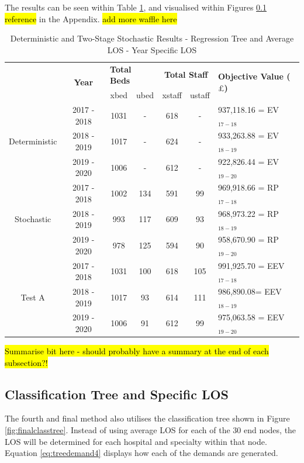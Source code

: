 \documentclass[../thesis.tex]{subfiles}
\begin{document}
The results can be seen within Table \ref{tab:Results8}, and visualised within Figures \ref{} \hl{reference} in the Appendix.
\hl{add more waffle here }
\begin{table}[h!]
    \centering
    \begin{tabular}{ccccccl}\toprule
 & \multirow{2}{*}{\textbf{Year}}& \multicolumn{2}{l}{\textbf{Total Beds}} & \multicolumn{2}{c}{\textbf{Total Staff}} & \multirow{2}{*}{\textbf{Objective Value ($\pounds$)}}\\ \cmidrule(lr){3-4} \cmidrule(lr){5-6}
&& xbed           & ubed          & xstaff         & ustaff         \\ \midrule
     \multirow{3}{*}{Deterministic} & 2017 - 2018 & 1031  & - & 618  & - & 937,118.16 =  EV$_{17-18}$ \\ 
      & 2018 - 2019 & 1017& - & 624 & - &  933,263.88 =  EV$_{18-19}$ \\
      & 2019 - 2020 & 1006  & - & 612 & - &  922,826.44 =  EV$_{19-20}$\\ \midrule
     \multirow{3}{*}{Stochastic} & 2017 - 2018 & 1002 & 134 &591  & 99 &  969,918.66 = RP$_{17-18}$ \\ 
      & 2018 - 2019 &  993 & 117  & 609  &  93& 968,973.22 =  RP$_{18-19}$ \\
      & 2019 - 2020 & 978 & 125 & 594 & 90& 958,670.90 =  RP$_{19-20}$\\ \midrule    
     \multirow{3}{*}{Test A} & 2017 - 2018 & 1031 & 100 & 618  &105  & 991,925.70 = EEV$_{17-18}$ \\ 
      & 2018 - 2019& 1017 &93 & 614  & 111 & 986,890.08=  EEV$_{18-19}$ \\
      & 2019 - 2020 & 1006 & 91 &612  &99 & 975,063.58 = EEV$_{19-20}$\\ \bottomrule       
    \end{tabular}
    \caption{Deterministic and Two-Stage Stochastic Results - Regression Tree and Average LOS - Year Specific LOS}
    \label{tab:Results8}
\end{table}


\hl{Summarise bit here - should probably have a summary at the end of each subsection?!}


\subsection{Classification Tree and Specific LOS}


The fourth and final method also utilises the classification tree shown in Figure \ref{fig:finalclasstree}. Instead of using average LOS for each of the 30 end nodes, the LOS will be determined for each hospital and specialty within that node. Equation \eqref{eq:treedemand4} displays how each of the demands are generated.
\end{document}
